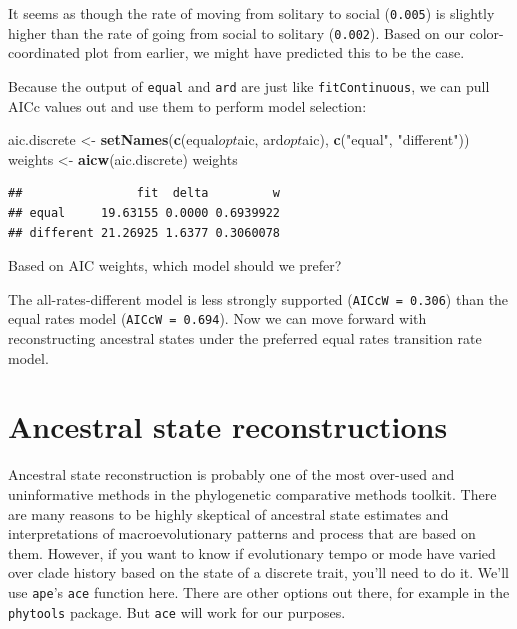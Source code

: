 \documentclass[]{book}
\newenvironment{Shaded}{\begin{snugshade}}{\end{snugshade}}
\newcommand{\KeywordTok}[1]{\textcolor[rgb]{0.13,0.29,0.53}{\textbf{{#1}}}}
\newcommand{\StringTok}[1]{\textcolor[rgb]{0.31,0.60,0.02}{{#1}}}
\newcommand{\NormalTok}[1]{{#1}}
\theoremstyle{definition}
\theoremstyle{definition}
\theoremstyle{definition}
\theoremstyle{remark}
\begin{document}
It seems as though the rate of moving from solitary to social
(\texttt{0.005}) is slightly higher than the rate of going from social
to solitary (\texttt{0.002}). Based on our color-coordinated plot from
earlier, we might have predicted this to be the case.

Because the output of \texttt{equal} and \texttt{ard} are just like
\texttt{fitContinuous}, we can pull AICc values out and use them to
perform model selection:

\begin{Shaded}
\begin{Highlighting}[]
\NormalTok{aic.discrete <-}\StringTok{ }\KeywordTok{setNames}\NormalTok{(}\KeywordTok{c}\NormalTok{(equal$opt$aic, ard$opt$aic), }\KeywordTok{c}\NormalTok{(}\StringTok{"equal"}\NormalTok{, }\StringTok{"different"}\NormalTok{))}
\NormalTok{weights <-}\StringTok{ }\KeywordTok{aicw}\NormalTok{(aic.discrete)}
\NormalTok{weights}
\end{Highlighting}
\end{Shaded}

\begin{verbatim}
##                fit  delta         w
## equal     19.63155 0.0000 0.6939922
## different 21.26925 1.6377 0.3060078
\end{verbatim}

Based on AIC weights, which model should we prefer?

The all-rates-different model is less strongly supported
(\texttt{AICcW\ =\ 0.306}) than the equal rates model
(\texttt{AICcW\ =\ 0.694}). Now we can move forward with reconstructing
ancestral states under the preferred equal rates transition rate model.

\section{Ancestral state
reconstructions}\label{ancestral-state-reconstructions}

Ancestral state reconstruction is probably one of the most over-used and
uninformative methods in the phylogenetic comparative methods toolkit.
There are many reasons to be highly skeptical of ancestral state
estimates and interpretations of macroevolutionary patterns and process
that are based on them. However, if you want to know if evolutionary
tempo or mode have varied over clade history based on the state of a
discrete trait, you'll need to do it. We'll use \texttt{ape}'s
\texttt{ace} function here. There are other options out there, for
example in the \texttt{phytools} package. But \texttt{ace} will work for
our purposes.
\end{document}
